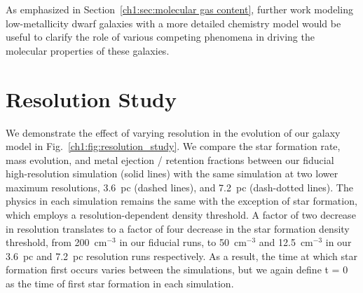 As emphasized in Section~\ref{ch1:sec:molecular gas content}, further work modeling low-metallicity dwarf galaxies with a more detailed chemistry model would be useful to clarify the role of various competing phenomena in driving the molecular properties of these galaxies.

\section{Resolution Study}
\label{appendix:resolution_study}

We demonstrate the effect of varying resolution in the evolution of our galaxy model in Fig.~\ref{ch1:fig:resolution_study}. We compare the star formation rate, mass evolution, and metal ejection / retention fractions between our fiducial high-resolution simulation (solid lines) with the same simulation at two lower maximum resolutions, 3.6~pc (dashed lines), and 7.2~pc (dash-dotted lines). The physics in each simulation remains the same with the exception of star formation, which employs a resolution-dependent density threshold. A factor of two decrease in resolution translates to a factor of four decrease in the star formation density threshold, from 200~cm$^{-3}$ in our fiducial runs, to 50~cm$^{-3}$ and 12.5~cm$^{-3}$ in our 3.6~pc and 7.2~pc resolution runs respectively. As a result, the time at which star formation first occurs varies between the simulations, but we again define t = 0 as the time of first star formation in each simulation.

